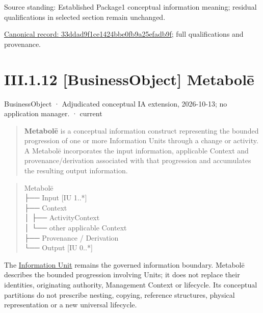 Source standing: Established Package1 conceptual information meaning; residual qualifications in selected section remain unchanged.


{\footnotesize \href{../../../../../../../continuum/business/business-object/33ddad9f1ce1424bbe0fb9a25efadb9f.md}{Canonical record: 33ddad9f1ce1424bbe0fb9a25efadb9f}; full qualifications and provenance.}\par
\section*{III.1.12 [BusinessObject] Metabolē}
\label{navigation:III.1.12}

\label{element:c34b4929f71946708d37dbe6c1da920a}
{\small BusinessObject · Adjudicated conceptual IA extension, 2026-10-13; no application manager. · current}\par

\begin{quote}


\textbf{Metabolē} is a conceptual information construct representing the bounded
progression of one or more Information Units through a change or activity.
A Metabolē incorporates the input information, applicable Context and
provenance/derivation associated with that progression and accumulates the
resulting output information.



\end{quote}


\begin{quote}\small\ttfamily
Metabolē\\
 ├── Input       [IU 1..*]\\
 ├── Context\\
 │    ├── ActivityContext\\
 │    └── other applicable Context\\
 ├── Provenance / Derivation\\
 └── Output      [IU 0..*]\\

\end{quote}


The \hyperref[element:10284034c8534b639284386b064f2c54]{Information Unit}
remains the governed information boundary. Metabolē describes the bounded
progression involving Units; it does not replace their identities, originating
authority, Management Context or lifecycle. Its conceptual partitions do not
prescribe nesting, copying, reference structures, physical representation or a
new universal lifecycle.



